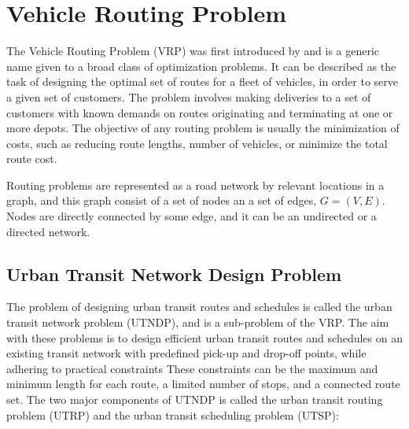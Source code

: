 \section{Vehicle Routing Problem }

The Vehicle Routing Problem (VRP) was first introduced by \citet{dantzig59} and is a generic name given to a broad class of optimization problems. It can be described as the task of designing the optimal set of routes for a fleet of vehicles, in order to serve a given set of customers. The problem involves making deliveries to a set of customers with known demands on routes originating and terminating at one or more depots. The objective of any routing problem is usually the minimization of costs, such as reducing route lengths, number of vehicles, or minimize the total route cost.

Routing problems are represented as a road network by relevant locations in a graph, and this graph consist of a set of nodes an a set of edges, $G = (V,E)$. Nodes are directly connected by some edge, and it can be an undirected or a directed network. 
\subsection{Urban Transit Network Design Problem}

The problem of designing urban transit routes and schedules is called the urban transit network problem (UTNDP), and is a sub-problem of the VRP. The aim with these problems is to design efficient urban transit routes and schedules on an existing transit network with predefined pick-up and drop-off points, while adhering to practical constraints These constraints can be the maximum and minimum length for each route, a limited number of stops, and a connected route set. The two major components of UTNDP is called the urban transit routing problem (UTRP) and the urban transit scheduling problem (UTSP):

